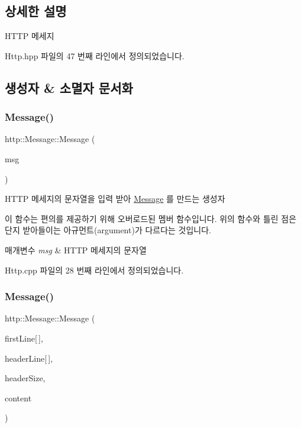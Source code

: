 \subsection{상세한 설명}
H\+T\+TP 메세지 

Http.\+hpp 파일의 47 번째 라인에서 정의되었습니다.



\subsection{생성자 \& 소멸자 문서화}
\mbox{\label{classhttp_1_1_message_af708fe5d0db7f88afe44665ddcf2205a}} 
\subsubsection{\texorpdfstring{Message()}{Message()}\hspace{0.1cm}{\footnotesize\ttfamily [1/2]}}
{\footnotesize\ttfamily http\+::\+Message\+::\+Message (\begin{DoxyParamCaption}\item[{std\+::string}]{msg }\end{DoxyParamCaption})}



H\+T\+TP 메세지의 문자열을 입력 받아 \hyperlink{classhttp_1_1_message}{Message} 를 만드는 생성자 

이 함수는 편의를 제공하기 위해 오버로드된 멤버 함수입니다. 위의 함수와 틀린 점은 단지 받아들이는 아규먼트(argument)가 다르다는 것입니다. 
\begin{DoxyParams}{매개변수}
{\em msg} & H\+T\+TP 메세지의 문자열 \\
\hline
\end{DoxyParams}


Http.\+cpp 파일의 28 번째 라인에서 정의되었습니다.

\mbox{\label{classhttp_1_1_message_a3b0418444366710791deda1abe0f9f9f}} 
\subsubsection{\texorpdfstring{Message()}{Message()}\hspace{0.1cm}{\footnotesize\ttfamily [2/2]}}
{\footnotesize\ttfamily http\+::\+Message\+::\+Message (\begin{DoxyParamCaption}\item[{std\+::string}]{first\+Line\mbox{[}$\,$\mbox{]},  }\item[{\hyperlink{structhttp_1_1_header_line}{Header\+Line}}]{header\+Line\mbox{[}$\,$\mbox{]},  }\item[{int}]{header\+Size,  }\item[{std\+::string}]{content }\end{DoxyParamCaption})}



